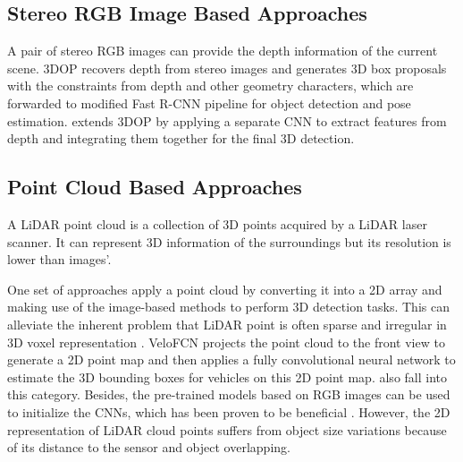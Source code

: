 
\subsection{Stereo RGB Image Based Approaches}
A pair of stereo RGB images can provide the depth information of the current scene. 3DOP \cite{DBLP:journals/corr/ChenKZMFU16} recovers depth from stereo images and generates 3D box proposals with the constraints from depth and other geometry characters, which are forwarded to modified Fast R-CNN \cite{DBLP:journals/corr/Girshick15} pipeline for object detection and pose estimation. \cite{PHAM2017110} extends 3DOP by applying a separate CNN to extract features from depth and integrating them together for the final 3D detection.


\subsection{Point Cloud Based Approaches}

A LiDAR point cloud is a collection of 3D points acquired by a LiDAR laser scanner. It can represent 3D information of the surroundings but its resolution is lower than images'.

One set of approaches apply a point cloud by converting it into a 2D array and making use of the image-based methods to perform 3D detection tasks. This can alleviate the inherent problem that LiDAR point is often sparse and irregular in 3D voxel representation . VeloFCN \cite{DBLP:journals/corr/LiZX16} projects the point cloud to the front view to generate a 2D point map and then applies a fully convolutional neural network to estimate the 3D bounding boxes for vehicles on this 2D point map. \cite{DBLP:journals/corr/abs-1710-07368, Chen:2015:OPA:2969239.2969287} also fall into this category. Besides, the pre-trained models based on RGB images can be used to initialize the CNNs, which has been proven to be beneficial \cite{DBLP:journals/corr/GuptaGAM14}. However, the 2D representation of LiDAR cloud points suffers from object size variations because of its distance to the sensor and object overlapping.

